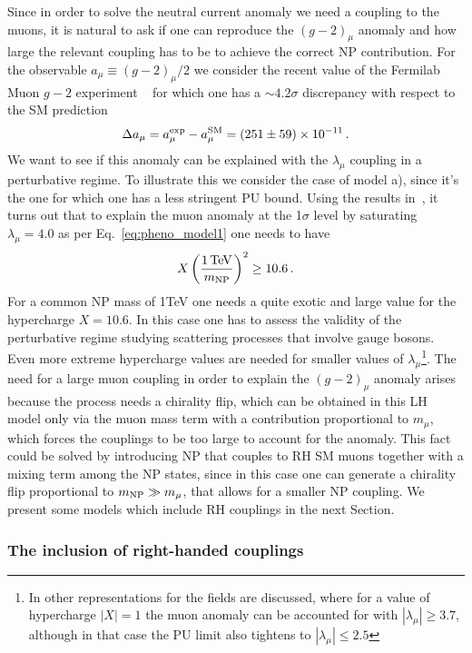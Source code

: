 \documentclass[a4paper,11pt]{article}
\newcommand{\be}{\begin{equation}}
\newcommand{\ee}{\end{equation}}
\begin{document}
Since in order to solve the neutral current anomaly we need a coupling to the muons, it is natural to ask if one can reproduce the $(g-2)_\mu$ anomaly and how large the relevant coupling has to be to achieve the correct NP contribution. For the observable $a_\mu\equiv(g-2)_\mu/2$  we consider the recent value of the Fermilab Muon $g-2$ experiment ~\cite{Muong-2:2021ojo} for which one has  a $\sim4.2\sigma$ discrepancy with respect to the SM prediction~\cite{Aoyama:2020ynm}
\be
\Delta a_\mu=a_\mu^{\rm exp}-a_\mu^{\rm SM}=(251\pm59)\times 10^{-11}\,.
\label{eq:gm2}
\ee
We want to see if this anomaly can be explained with the $\lambda_\mu$ coupling in a perturbative regime. To illustrate this we consider the case of model a), since it's the one for which one has a less stringent PU bound. Using the results in~\cite{Arnan:2016cpy}, it turns out that to explain the muon anomaly at  the 1$\sigma$ level by saturating  $\lambda_\mu = 4.0$ as per  Eq.~\eqref{eq:pheno_model1} one needs to have
\begin{equation}
X\left(\dfrac{1\, {\rm TeV}}{m_{\rm NP}}\right)^2 \geq 10.6\, . 
\end{equation}
For a common NP mass of 1\;TeV one needs a quite exotic and large value for the hypercharge
$X=10.6$. In this case one has to assess the validity of the perturbative regime studying scattering processes that involve gauge bosons.
Even more extreme hypercharge values are needed for smaller values of $\lambda_\mu$\footnote{In \cite{Arnan:2016cpy} other representations for the fields are discussed, where for a value of hypercharge $|X|=1$ the muon anomaly can be accounted for with $|\lambda_\mu| \geq 3.7$, although in that case the PU limit also tightens to $|\lambda_\mu| \leq {2.5}$}. 
The need for a large muon coupling in order to explain the $(g-2)_\mu$ anomaly arises because the process needs a chirality flip, which can be obtained in this LH model only via the muon mass term with a contribution proportional to $m_\mu$, which forces the couplings to be too large to account for the anomaly.  This fact could be solved by introducing NP that couples to RH SM muons together with a mixing term among the NP states, since in this case one can generate a chirality flip  proportional to $m_{\rm NP}\gg m_\mu$, that allows for a smaller NP coupling.
 We present some models which include RH couplings in the next Section.



\subsubsection{The inclusion of right-handed couplings}
\end{document}
